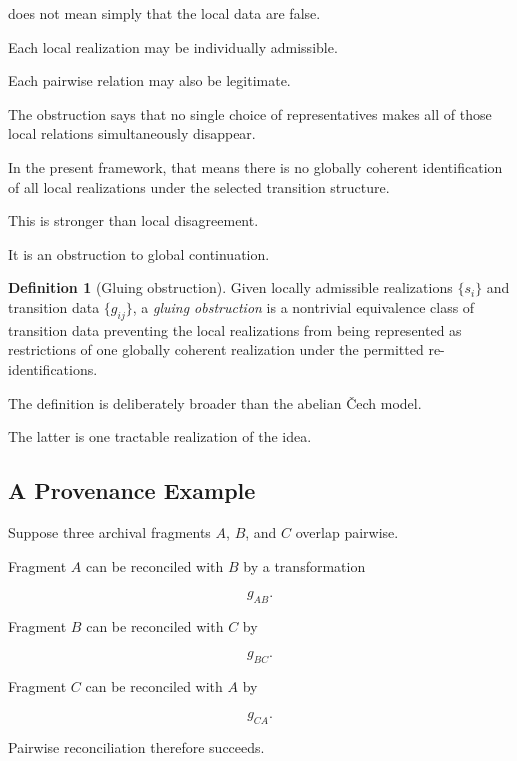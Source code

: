 \documentclass[
  11pt,
  a4paper,
  DIV=12,
  BCOR=0mm,
  parskip=half-
]{scrartcl}
\theoremstyle{definition}
\newtheorem{definition}{Definition}[section]
\theoremstyle{plain}
\theoremstyle{remark}
\begin{document}
does not mean simply that the local data are false.

Each local realization may be individually admissible.

Each pairwise relation may also be legitimate.

The obstruction says that no single choice of representatives makes all of
those local relations simultaneously disappear.

In the present framework, that means there is no globally coherent
identification of all local realizations under the selected transition
structure.

This is stronger than local disagreement.

It is an obstruction to global continuation.

\begin{definition}[Gluing obstruction]
\label{def:gluing-obstruction}
Given locally admissible realizations \(\{s_i\}\) and transition data
\(\{g_{ij}\}\), a \emph{gluing obstruction} is a nontrivial equivalence class
of transition data preventing the local realizations from being represented as
restrictions of one globally coherent realization under the permitted
re-identifications.
\end{definition}

The definition is deliberately broader than the abelian Čech model.

The latter is one tractable realization of the idea.


\subsection{A Provenance Example}
\label{app:provenance-gluing}

Suppose three archival fragments \(A\), \(B\), and \(C\) overlap pairwise.

Fragment \(A\) can be reconciled with \(B\) by a transformation

\[
  g_{AB}.
\]

Fragment \(B\) can be reconciled with \(C\) by

\[
  g_{BC}.
\]

Fragment \(C\) can be reconciled with \(A\) by

\[
  g_{CA}.
\]

Pairwise reconciliation therefore succeeds.
\end{document}
